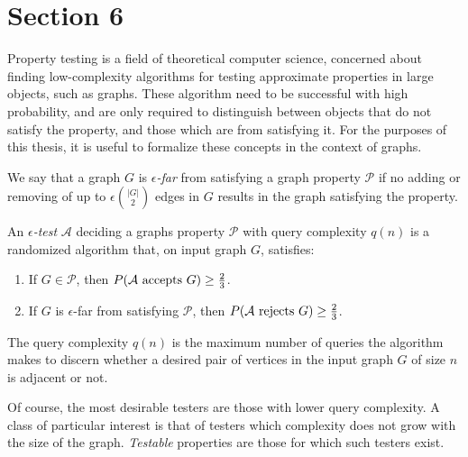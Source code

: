 \section{Section 6} \label{sec:section_6}


    Property testing is a field of theoretical computer science, concerned about finding low-complexity algorithms
    for testing approximate properties in large objects, such as graphs.
    These algorithm need to be successful with high probability, and are only required to distinguish between objects
    that do not satisfy the property, and those which are  from satisfying it.
    For the purposes of this thesis, it is useful to formalize these concepts in the context of graphs.

    \begin{definition}
        We say that a graph $G$ is \emph{$\epsilon$-far} from satisfying a graph property $\mathcal{P}$ if no adding or
        removing of up to $\epsilon {|G| \choose 2}$ edges in $G$ results in the graph satisfying the property.
    \end{definition}

    \begin{definition}
        An \emph{$\epsilon$-test} $\mathcal{A}$ deciding a graphs property $\mathcal{P}$ with query complexity
        $q(n)$ is a randomized algorithm that, on input graph $G$,
        satisfies:
        \begin{enumerate}
            \item If $G \in \mathcal{P}$, then $P( \mathcal{A} \text{ accepts } G ) \geq \frac{2}{3}$.
            \item If $G$ is $\epsilon$-far from satisfying $\mathcal{P}$,
                then $P( \mathcal{A} \text{ rejects } G ) \geq \frac{2}{3}$.
        \end{enumerate}

        The query complexity $q(n)$ is the maximum number of queries the algorithm makes to discern whether a desired
        pair of vertices in the input graph $G$ of size $n$ is adjacent or not.
    \end{definition}

    Of course, the most desirable testers are those with lower query complexity.
    A class of particular interest is that of testers which complexity does not grow with the size of the
    graph.
    \emph{Testable} properties are those for which such testers exist.

